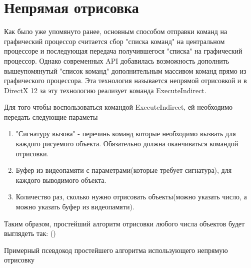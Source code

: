 \section{Непрямая отрисовка} \label{ch3:indirect_draw}
Как было уже упомянуто ранее, основным способом отправки команд на графический процессор считается сбор "списка команд" на центральном процессоре и последующая передача получившегося "списка" на графический процессор. Однако современных API добавилась возможность дополнить вышеупомянутый "список команд" дополнительным массивом команд прямо из графического процессора. Эта технология называется непрямой отрисовкой и в DirectX 12 за эту технологию реализует команда ExecuteIndirect. 

Для того чтобы воспользоваться командой ExecuteIndirect, ей необходимо передать следующие параметы
\begin{enumerate}[1.] 
	\item "Сигнатуру вызова" - перечинь команд которые необходимо вызвать для каждого рисуемого объекта. Обязательно должна оканчиваться командой отрисовки.
	\item Буфер из видеопамяти с параметрами(которые требует сигнатура), для каждого выводимого объекта.
	\item Количество раз, сколько нужно отрисовать объекты(можно указать число, а можно указать буфер из видеопамяти).
\end{enumerate}

Таким образом, простейший алгоритм отрисовки любого числа объектов будет выглядеть так: ()

\begin{algorithm} %
	\nonl{}
	\caption{Примерный псевдокод простейшего алгоритма использующего непрямую отрисовку}\label{alg:simpleIndirect}
\end{algorithm}
\FloatBarrier

